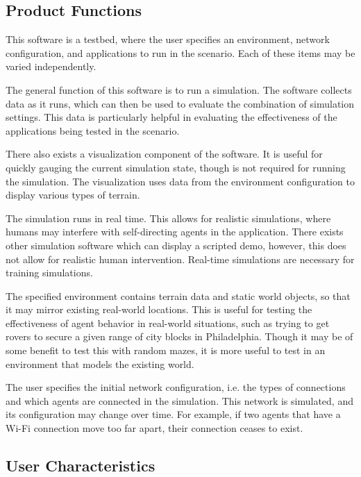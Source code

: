 \documentclass[titlepage]{article}
\begin{document}
\subsection{Product Functions%
  \label{product-functions}%
}

This software is a testbed, where the user specifies an environment, network configuration, and applications to run in the scenario. Each of these items may be varied independently.

The general function of this software is to run a simulation.  The software collects data as it runs, which can then be used to evaluate the combination of simulation settings. 
This data is particularly helpful in evaluating the effectiveness of the applications being tested in the scenario.

There also exists a visualization component of the software. It is useful for quickly gauging the current simulation state, though is not required for running the simulation.  The visualization uses data from the environment configuration to display various types of terrain.

The simulation runs in real time.  This allows for realistic simulations, where humans may interfere with self-directing agents in the application. There exists other simulation software which can display a scripted demo, however, this does not allow for realistic human intervention.  Real-time simulations are necessary for training simulations.

The specified environment contains terrain data and static world objects, so that it may mirror existing real-world locations.  This is useful for testing the effectiveness of agent behavior in real-world situations, such as trying to get rovers to secure a given range of city blocks in Philadelphia. Though it may be of some benefit to test this with random mazes, it is more useful to test in an environment that models the existing world.

The user specifies the initial network configuration, i.e. the types of connections and which agents are connected in the simulation.  This network is simulated, and its configuration may change over time. For example, if two agents that have a Wi-Fi connection move too far apart, their connection ceases to exist. 



\subsection{User Characteristics%
  \label{user-characteristics}%
}
\end{document}
